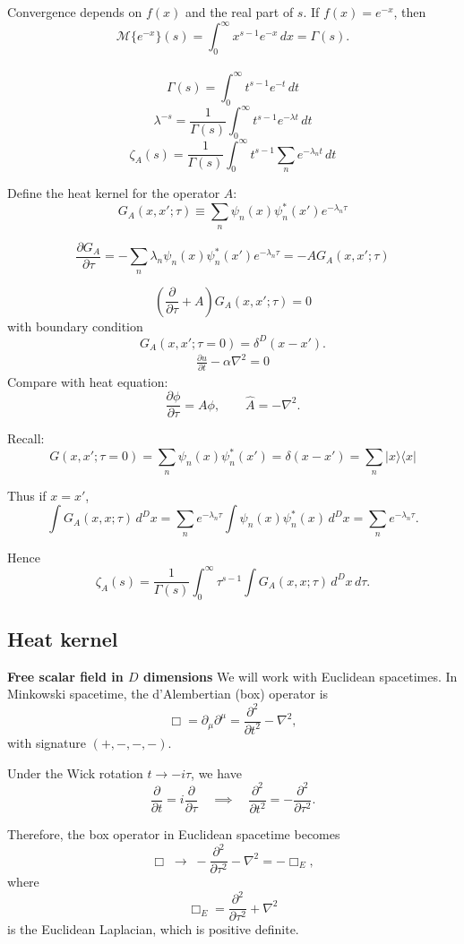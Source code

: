 \documentclass[14pt]{article} %
\begin{document}
Convergence depends on $f(x)$ and the real part of $s$.
If $f(x) = e^{-x}$, then
\[
\mathcal{M}\{e^{-x}\}(s) = \int_{0}^{\infty} x^{s-1} e^{-x}\, dx = \Gamma(s).
\]
\\
\[
\Gamma(s) = \int_0^\infty t^{s-1} e^{-t} \, dt
\]
\[
\lambda^{-s} = \frac{1}{\Gamma(s)} \int_0^\infty t^{s-1} e^{-\lambda t} \, dt
\]
\[
\zeta_A(s) = \frac{1}{\Gamma(s)} \int_0^\infty t^{s-1} \sum_n e^{-\lambda_n t} \, dt
\]

Define the heat kernel for the operator $A$:
\[
G_A(x,x';\tau) \equiv \sum_n \psi_n(x) \psi_n^*(x') e^{-\lambda_n \tau}
\]

\[
\frac{\partial G_A}{\partial \tau} = -\sum_n \lambda_n \psi_n(x) \psi_n^*(x') e^{-\lambda_n \tau}
= -A G_A(x,x';\tau)
\]

\[
\left( \frac{\partial}{\partial \tau} + A \right) G_A(x,x';\tau) = 0
\]
with boundary condition
\[
G_A(x,x';\tau=0) = \delta^D(x-x').
\]
\begin{align*}
\frac{\partial u}{\partial t} - \alpha \nabla^2 = 0
\end{align*}
Compare with heat equation:
\[
\frac{\partial \phi}{\partial \tau} = A \phi, \qquad \hat{A} = -\nabla^2.
\]

Recall:
\[
G(x,x';\tau=0) = \sum_n \psi_n(x)\psi_n^*(x') = \delta(x-x')
= \sum_n |x\rangle\langle x|
\]

Thus if $x=x'$,
\[
\int G_A(x,x;\tau) \, d^D x = \sum_n e^{-\lambda_n \tau} \int \psi_n(x)\psi_n^*(x) \, d^D x
= \sum_n e^{-\lambda_n \tau}.
\]

Hence
\[
\zeta_A(s) = \frac{1}{\Gamma(s)} \int_0^\infty \tau^{s-1} \int G_A(x,x;\tau) \, d^D x \, d\tau.
\]

\subsection{Heat kernel}
\noindent \textbf{Free scalar field in $D$ dimensions}
We will work with Euclidean spacetimes.
In Minkowski spacetime, the d'Alembertian (box) operator is
\[
\Box = \partial_\mu \partial^\mu = \frac{\partial^2}{\partial t^2} - \nabla^2,
\]
with signature $(+,-,-,-)$.

Under the Wick rotation $t \to -i\tau$, we have
\[
\frac{\partial}{\partial t} = i \frac{\partial}{\partial \tau} \quad \implies \quad \frac{\partial^2}{\partial t^2} = - \frac{\partial^2}{\partial \tau^2}.
\]

Therefore, the box operator in Euclidean spacetime becomes
\[
\Box \;\longrightarrow\; - \frac{\partial^2}{\partial \tau^2} - \nabla^2 = - \Box_E,
\]
where
\[
\Box_E = \frac{\partial^2}{\partial \tau^2} + \nabla^2
\]
is the Euclidean Laplacian, which is positive definite.
\end{document}
